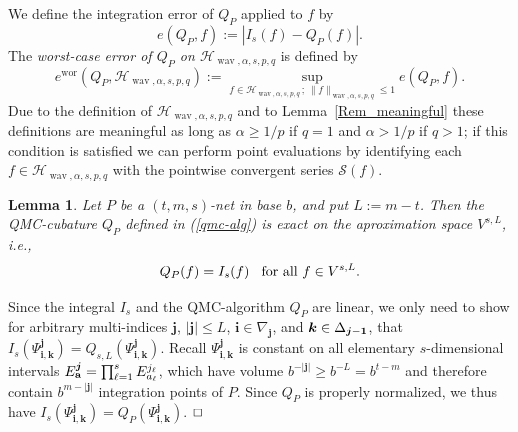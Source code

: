 \documentclass[12pt]{article}
\DeclareMathOperator{\wav}{wav}
\DeclareMathOperator{\wor}{wor}
\newtheorem{lemma}{Lemma}
\newenvironment{proof}{\begin{trivlist}
    \item[\hskip\labelsep{\it Proof.}]}{$\hfill\Box$\end{trivlist}}
\newcommand{\bsk}{\boldsymbol{k}}
\newcommand{\bsi}{\boldsymbol{i}}
\newcommand{\bsj}{\boldsymbol{j}}
\newcommand{\HH}{\mathcal{H}}
\begin{document}
We define the integration error of $Q_P$ applied to $f$ by
\begin{equation}\label{ie}
e(Q_P,f) := | I_s(f) - Q_P(f)|. 
\end{equation}
The \emph{worst-case error of $Q_P$ on $\HH_{\wav,\alpha,s,p,q}$} is defined by
\begin{equation}\label{wce}
e^{\wor}(Q_P, \HH_{\wav,\alpha,s,p,q}) :=
\sup_{f \in \HH_{\wav,\alpha,s,p,q}\,;\,\|f\|_{\wav,\alpha, s,p,q}\le 1} e(Q_P,f).
\end{equation}
Due to the definition of $\HH_{\wav,\alpha,s,p,q}$ and to Lemma~\ref{Rem_meaningful} these 
definitions are meaningful as long as 
$\alpha \ge 1/p$ if $q=1$ and  $\alpha > 1/p$ if $q>1$; if this condition is satisfied we can perform point evaluations by identifying each $f\in \HH_{\wav,\alpha,s,p,q}$ with the pointwise convergent series $\mathcal{S}(f)$.


\begin{lemma}\label{Exakt}
Let $P$ be a $(t,m,s)$-net in base $b$, and put $L:= m-t$.
Then the QMC-cubature  $Q_{P}$ defined in (\ref{qmc-alg})
is \emph{exact} on the aproximation space $V^{s,L}$, i.e.,
\begin{equation*}%
Q_{P}(f) = I_s(f) 
\hspace{2ex}\text{for all $f\in V^{s,L}$.}
\end{equation*}
\end{lemma}


\begin{proof}
Since the integral $I_s$ and the QMC-algorithm $Q_{P}$ are linear,
we only need to show for arbitrary multi-indices $\bsj$,
$|\bsj| \le L$, $\bsi\in \nabla_{\bsj}$, and
$\bsk \in \Delta_{\bsj-{\bf 1}}$, that 
$I_s(\Psi^{\bsj}_{\bsi,\bsk}) = Q_{s,L}(\Psi^{\bsj}_{\bsi,\bsk})$.
Recall $\Psi^{\bsj}_{\bsi, \bsk}$ is constant on all
elementary $s$-dimensional intervals
$E^{\bsj}_{\bf a} =
\prod^s_{\ell=1} E^{j_\ell}_{a_\ell}$, which have volume
$b^{-|\bsj|} \ge b^{-L} = b^{t-m}$
and therefore contain $b^{m-|\bsj|}$ integration points of
$P$. Since $Q_{P}$ is properly normalized, we thus have
$I_s(\Psi^{\bsj}_{\bsi, \bsk}) = Q_{P}(\Psi^{\bsj}_{\bsi, \bsk})$.
\end{proof}
\end{document}

